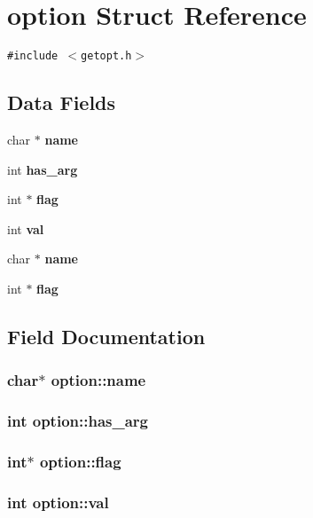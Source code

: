 \section{option Struct Reference}
\label{structoption}
{\tt \#include $<$getopt.h$>$}

\subsection*{Data Fields}
\begin{CompactItemize}
\item 
char $\ast$ {\bf name}
\item 
int {\bf has\_\-arg}
\item 
int $\ast$ {\bf flag}
\item 
int {\bf val}
\item 
char $\ast$ {\bf name}
\item 
int $\ast$ {\bf flag}
\end{CompactItemize}


\subsection{Field Documentation}
\subsubsection{\setlength{\rightskip}{0pt plus 5cm}char$\ast$ {\bf option::name}}\label{structoption_92c850a23c7828c1dba453bf8d15e1f0}


\subsubsection{\setlength{\rightskip}{0pt plus 5cm}int {\bf option::has\_\-arg}}\label{structoption_90d7ee9a51eea5c002682dbd0af149e4}


\subsubsection{\setlength{\rightskip}{0pt plus 5cm}int$\ast$ {\bf option::flag}}\label{structoption_b366eea5fe7be25c1928328ba715e353}


\subsubsection{\setlength{\rightskip}{0pt plus 5cm}int {\bf option::val}}\label{structoption_13bd155ec3b405d29c41ab8d0793be11}


